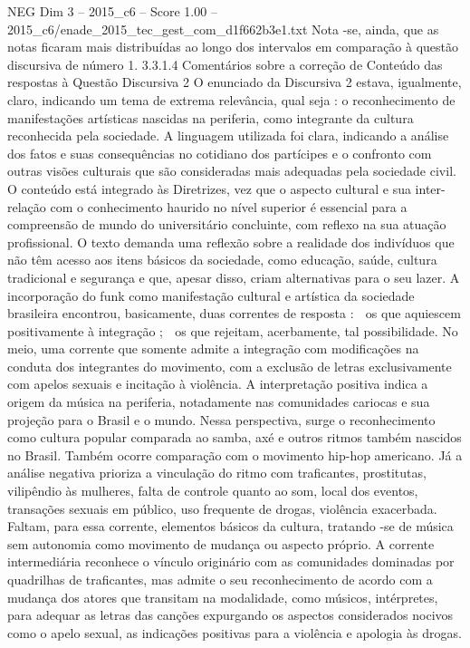 \begin{textsample}{NEG Dim 3 – 2015\_c6 – Score 1.00 – 2015\_c6/enade\_2015\_tec\_gest\_com\_d1f662b3e1.txt}
Nota -se, ainda, que as notas ficaram mais distribuídas ao longo dos intervalos em comparação à questão discursiva de número 1. 3.3.1.4 Comentários sobre a correção de Conteúdo das respostas à Questão Discursiva 2 O enunciado da Discursiva 2 estava, igualmente, claro, indicando um tema de extrema relevância, qual seja : o reconhecimento de manifestações artísticas nascidas na periferia, como integrante da cultura reconhecida pela sociedade.
A linguagem utilizada foi clara, indicando a análise dos fatos e suas consequências no cotidiano dos partícipes e o confronto com outras visões culturais que são consideradas mais adequadas pela sociedade civil.
O conteúdo está integrado às Diretrizes, vez que o aspecto cultural e sua inter-relação com o conhecimento haurido no nível superior é essencial para a compreensão de mundo do universitário concluinte, com reflexo na sua atuação profissional.
O texto demanda uma reflexão sobre a realidade dos indivíduos que não têm acesso aos itens básicos da sociedade, como educação, saúde, cultura tradicional e segurança e que, apesar disso, criam alternativas para o seu lazer.
A incorporação do funk como manifestação cultural e artística da sociedade brasileira encontrou, basicamente, duas correntes de resposta :  os que aquiescem positivamente à integração ;  os que rejeitam, acerbamente, tal possibilidade.
No meio, uma corrente que somente admite a integração com modificações na conduta dos integrantes do movimento, com a exclusão de letras exclusivamente com apelos sexuais e incitação à violência.
A interpretação positiva indica a origem da música na periferia, notadamente nas comunidades cariocas e sua projeção para o Brasil e o mundo.
Nessa perspectiva, surge o reconhecimento como cultura popular comparada ao samba, axé e outros ritmos também nascidos no Brasil.
Também ocorre comparação com o movimento hip-hop americano.
Já a análise negativa prioriza a vinculação do ritmo com traficantes, prostitutas, vilipêndio às mulheres, falta de controle quanto ao som, local dos eventos, transações sexuais em público, uso frequente de drogas, violência exacerbada.
Faltam, para essa corrente, elementos básicos da cultura, tratando -se de música sem autonomia como movimento de mudança ou aspecto próprio.
A corrente intermediária reconhece o vínculo originário com as comunidades dominadas por quadrilhas de traficantes, mas admite o seu reconhecimento de acordo com a mudança dos atores que transitam na modalidade, como músicos, intérpretes, para adequar as letras das canções expurgando os aspectos considerados nocivos como o apelo sexual, as indicações positivas para a violência e apologia às drogas.

\end{textsample}
